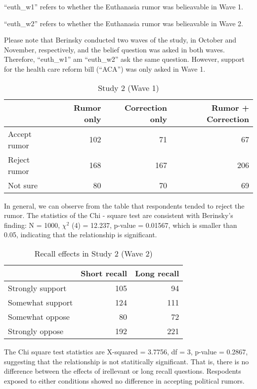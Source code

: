 \documentclass[AER]{AEA}
\begin{document}
``euth\_w1'' refers to whether the Euthanasia rumor was belieavable in
Wave 1.

``euth\_w2'' refers to whether the Euthanasia rumor was belieavable in
Wave 2.

Please note that Berinsky conducted two waves of the study, in October
and November, respectively, and the belief question was asked in both
waves. Therefore, ``euth\_w1'' am ``euth\_w2'' ask the same question.
However, support for the health care reform bill (``ACA'') was only
asked in Wave 1.

\begin{table}[!h]

\caption{\label{tab:unnamed-chunk-13}Study 2 (Wave 1)}
\centering
\begin{tabular}[t]{lrrr}
\toprule
  & Rumor only & Correction only & Rumor + Correction\\
\midrule
Accept rumor & 102 & 71 & 67\\
Reject rumor & 168 & 167 & 206\\
Not sure & 80 & 70 & 69\\
\bottomrule
\end{tabular}
\end{table}

In general, we can observe from the table that respondents tended to
reject the rumor. The statistics of the Chi - square test are consistent
with Berinsky's finding: N = 1000, \(\chi^2\) (4) = 12.237, p-value =
0.01567, which is smaller than 0.05, indicating that the relationship is
significant.

\begin{table}[!h]

\caption{\label{tab:unnamed-chunk-14}Recall effects in Study 2 (Wave 2)}
\centering
\begin{tabular}[t]{lrr}
\toprule
  & Short recall & Long recall\\
\midrule
Strongly support & 105 & 94\\
Somewhat support & 124 & 111\\
Somewhat oppose & 80 & 72\\
Strongly oppose & 192 & 221\\
\bottomrule
\end{tabular}
\end{table}

The Chi square test statistics are X-squared = 3.7756, df = 3, p-value =
0.2867, suggesting that the relationship is not statitically
significant. That is, there is no difference between the effects of
irellevant or long recall questions. Respodents exposed to either
conditions showed no difference in accepting political rumors.
\end{document}
